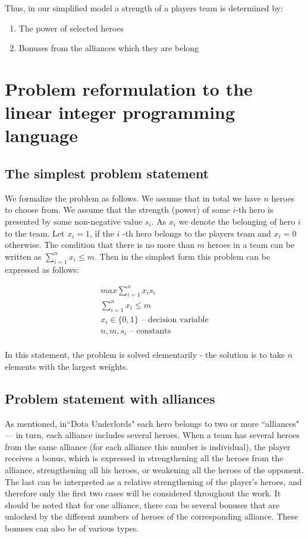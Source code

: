 \documentclass[smallextended]{svjour3}       %
\begin{document}
Thus, in our simplified model a strength of a players team is determined by:

\begin{enumerate}
    \item The power of selected heroes
    \item Bonuses from the alliances which they are belong
\end{enumerate}


\section{Problem reformulation to the linear integer programming language }
\label{SectionDUIP}

\subsection{The simplest problem statement}

We formalize the problem as follows. We assume that in total we have $n$ heroes to choose from. We assume that the strength (power) of some $i$-th hero is presented by some non-negative value $s_i$. As $x_i$ we denote the belonging of hero $i$ to the team. Let $ x_i = 1 $, if the $ i $ -th hero belongs to the players team and $ x_i = 0 $ otherwise. The condition that there is no more than $m$ heroes in a team  can be written as $ \sum_{i=1}^n x_i \leq m $. Then in the simplest form this problem can be expressed as follows:

\begin{equation}
\begin{gathered}
    max \sum_{i=1}^n x_i s_i \\
    \sum_{i=1}^n x_i \leq m \\
    x_i \in \{0, 1\} \text{ – decision variable} \\
   n, m, s_i \text{ – constants}  \\
\end{gathered}
\end{equation}


In this statement, the problem is solved elementarily - the solution is to take $ n $ elements with the largest weights.

\subsection{Problem statement with alliances}
As mentioned, in``Dota Underlords" each hero belongs to two or more ``alliances" --- in turn, each alliance includes several heroes. When a team has several heroes from the same alliance (for each alliance this number is individual), the player receives a bonus, which is expressed in strengthening all the heroes from the alliance, strengthening all his heroes, or weakening all the heroes of the opponent. The last can be interpreted as a relative strengthening of the player’s heroes, and therefore only the first two cases will be considered throughout the work. It should be noted that for one alliance, there can be several bonuses that are unlocked by the different numbers of heroes of the corresponding alliance. These bonuses can also be of various types.
\end{document}
